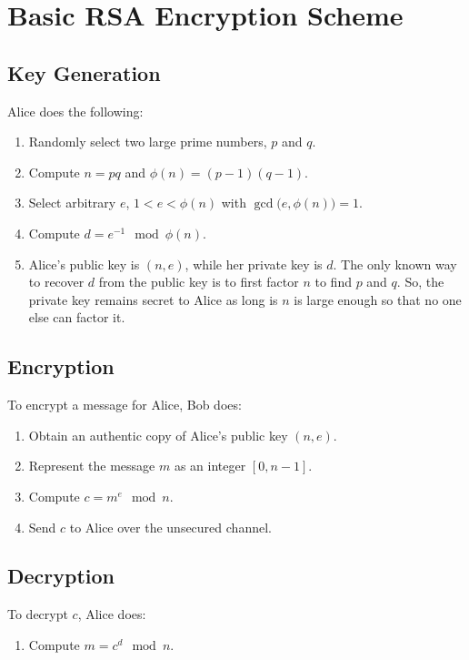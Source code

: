 \section{Basic RSA Encryption Scheme}
\subsection*{Key Generation}
Alice does the following:
\begin{enumerate}
      \item Randomly select two large prime numbers, $ p $ and $ q $.
      \item Compute $ n=pq $ and $ \phi(n)=(p-1)(q-1) $.
      \item Select arbitrary $ e $, $ 1<e<\phi(n) $ with $ \gcd\bigl(e,\phi(n)\bigr)=1 $.
      \item Compute $ d= e^{-1}\mod \phi(n) $.
      \item Alice's public key is $ (n,e) $, while her private key is $ d $.
            The only known way to recover $ d $ from the public key is to first factor
            $ n $ to find $ p $ and $ q $. So, the private key remains secret
            to Alice as long is $ n $ is large enough so that no one else can factor it.
\end{enumerate}
\subsection*{Encryption}
To encrypt a message for Alice, Bob does:
\begin{enumerate}
      \item Obtain an authentic copy of Alice's public key $ (n,e) $.
      \item Represent the message $ m $ as an integer $ [0,n-1] $.
      \item Compute $ c= m^e \mod n $.
      \item Send $ c $ to Alice over the unsecured channel.
\end{enumerate}
\subsection*{Decryption}
To decrypt $ c $, Alice does:
\begin{enumerate}
      \item Compute $ m= c^d\mod n $.
\end{enumerate}

